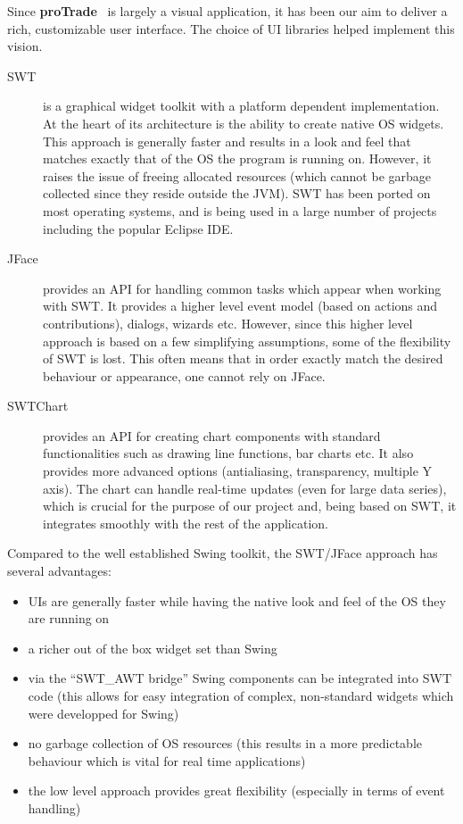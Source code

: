 \documentclass[10pt]{report}
\newcommand{\nm}{{\bf proTrade}}
\newcommand{\nmsp}{{\nm \ }}
\begin{document}
Since {\nmsp} is largely a visual application, it has been our aim to deliver a rich, customizable user interface. The choice of UI libraries helped implement this vision.

\begin{description}

\item[SWT] is a graphical widget toolkit with a platform dependent implementation. At the heart of its architecture is the ability to create native OS widgets. This approach is generally faster and results in a look and feel that matches exactly that of the OS the program is running on. However, it raises the issue of freeing allocated resources (which cannot be garbage collected since they reside outside the JVM). SWT has been ported on most operating systems, and is being used in a large number of projects including the popular Eclipse IDE.

\item[JFace] provides an API for handling common tasks which appear when working with SWT. It provides a higher level event model (based on actions and contributions), dialogs, wizards etc. However, since this higher level approach is based on a few simplifying assumptions, some of the flexibility of SWT is lost. This often means that in order exactly match the desired behaviour or appearance, one cannot rely on JFace.

\item[SWTChart] provides an API for creating chart components with standard functionalities such as drawing line functions, bar charts etc. It also provides more advanced options (antialiasing, transparency, multiple Y axis). The chart can handle real-time updates (even for large data series), which is crucial for the purpose of our project and, being based on SWT, it integrates smoothly with the rest of the application. 

\end{description}

Compared to the well established Swing toolkit, the SWT/JFace approach has several advantages:
\begin{itemize}
  \item UIs are generally faster while having the native look and feel of the OS they are running on
  \item a richer out of the box widget set than Swing
  \item via the ``SWT\_AWT bridge'' Swing components can be integrated into SWT code (this allows for easy integration of complex, non-standard widgets which were developped for Swing)
  \item no garbage collection of OS resources (this results in a more predictable behaviour which is vital for real time applications)
  \item the low level approach provides great flexibility (especially in terms of event handling)
\end{itemize}
\end{document}
